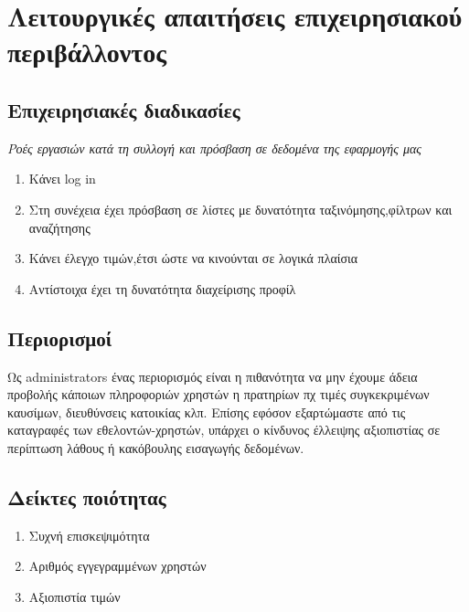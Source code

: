 \section{Λειτουργικές απαιτήσεις επιχειρησιακού περιβάλλοντος}



\subsection{Επιχειρησιακές διαδικασίες}
\textit{Ροές εργασιών κατά τη συλλογή και πρόσβαση σε δεδομένα της εφαρμογής μας}


\begin{enumerate}
	\item Κάνει log in
	\item Στη συνέχεια έχει πρόσβαση σε λίστες με δυνατότητα ταξινόμησης,φίλτρων και αναζήτησης
	\item Κάνει έλεγχο τιμών,έτσι ώστε να κινούνται σε λογικά πλαίσια
	\item Αντίστοιχα έχει τη δυνατότητα διαχείρισης προφίλ
\end{enumerate}



\subsection{Περιορισμοί}
Ως administrators ένας περιορισμός είναι η πιθανότητα να μην έχουμε άδεια προβολής κάποιων πληροφοριών χρηστών η πρατηρίων πχ τιμές συγκεκριμένων καυσίμων, διευθύνσεις κατοικίας κλπ. Επίσης εφόσον εξαρτώμαστε από τις καταγραφές των εθελοντών-χρηστών, υπάρχει ο κίνδυνος έλλειψης αξιοπιστίας σε περίπτωση λάθους ή κακόβουλης εισαγωγής δεδομένων.


\subsection{Δείκτες ποιότητας}
\begin{enumerate}
	\item Συχνή επισκεψιμότητα
	\item Αριθμός εγγεγραμμένων χρηστών 
	\item Αξιοπιστία τιμών
\end{enumerate}
